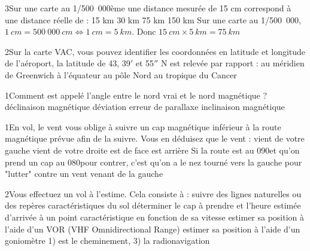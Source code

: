 {3}{Sur une carte au 1/500~000ème une distance mesurée de 15 cm correspond à une distance réelle de :}
{15 km}
{30 km}
{75 km}
{150 km} 
{Sur une carte au 1/500~000, $1~cm = 500~000~cm \Leftrightarrow 1~cm = 5~km$. Donc $15~cm \times 5~km = 75~km$}

{2}{Sur la carte VAC, vous pouvez identifier les coordonnées en latitude et longitude de l'aéroport, la latitude de 43\textdegree , 39$'$ et 55$''$ N est relevée par rapport :}
{au méridien de Greenwich}
{à l'équateur}
{au pôle Nord}
{au tropique du Cancer} 
{}

{1}{Comment est appelé l'angle entre le nord vrai et le nord magnétique ? }
{déclinaison magnétique}
{déviation}
{erreur de parallaxe}
{inclinaison magnétique} 
{}

{1}{En vol, le vent vous oblige à suivre un cap magnétique inférieur à la route magnétique prévue afin de la suivre. Vous en déduisez que le vent : }
{vient de votre gauche}
{vient de votre droite}
{est de face} 
{est arrière}
{Si la route est au 090\textdegree et qu'on prend un cap au 080\textdegree pour contrer, c'est qu'on a le nez tourné vers la gauche pour "lutter" contre un vent venant de la gauche}

{2}{Vous effectuez un vol à l'estime. Cela consiste à : }
{suivre des lignes naturelles ou des repères caractéristiques du sol}
{déterminer le cap à prendre et l'heure estimée d'arrivée à un point caractéristique en fonction de sa vitesse}
{estimer sa position à l'aide d'un VOR (VHF Omnidirectional Range)} 
{estimer sa position à l'aide d'un goniomètre}
{1) est le cheminement, 3) la radionavigation}
 
 
 

